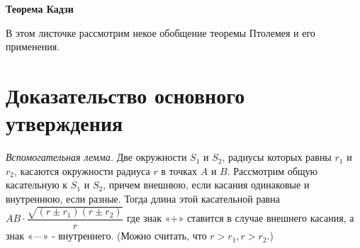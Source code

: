 \centerline{\bf \Huge Теорема Кадзи}

В этом листочке рассмотрим некое обобщение теоремы Птолемея и его применения.

\section{Доказательство основного утверждения}

\textit{Вспомогательная лемма.}
Две окружности $S_1$ и $S_2$, радиусы которых равны $r_1$ и $r_2$, касаются окружности радиуса $r$ в точках $A$ и $B$. Рассмотрим общую касательную к $S_1$ и $S_2$, причем внешнюю, если касания одинаковые и внутреннюю, если разные. Тогда длина этой касательной равна $AB \cdot \dfrac{\sqrt{\left(r \pm r_1\right)\left(r \pm r_2\right)}}{r}$ где знак «+» ставится в случае внешнего касания, а знак «---» - внутреннего. (Можно считать, что $r>r_1, r>r_2$.)

